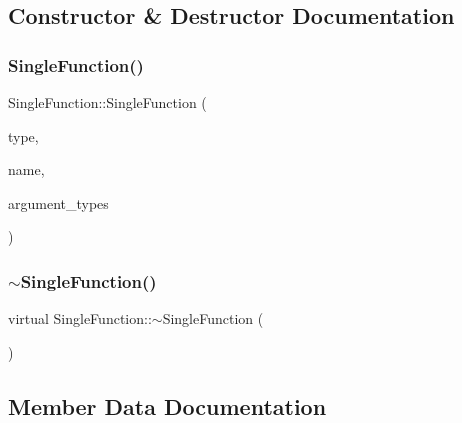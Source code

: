\subsection{Constructor \& Destructor Documentation}
\mbox{\label{classSingleFunction_a8c6cc400a8f83f317fa62de6886fde40}} 
\subsubsection{\texorpdfstring{Single\+Function()}{SingleFunction()}}
{\footnotesize\ttfamily Single\+Function\+::\+Single\+Function (\begin{DoxyParamCaption}\item[{\hyperlink{statics_8h_a025d9866e39f51183a23b3e2165f0e77}{F\+U\+N\+C\+T\+I\+O\+N\+\_\+\+T\+Y\+PE}}]{type,  }\item[{std\+::string}]{name,  }\item[{std\+::vector$<$ \hyperlink{classVarType}{Var\+Type} $>$}]{argument\+\_\+types }\end{DoxyParamCaption})}

\mbox{\label{classSingleFunction_ae414926a60c49b4039e7cd41a304ed77}} 
\subsubsection{\texorpdfstring{$\sim$\+Single\+Function()}{~SingleFunction()}}
{\footnotesize\ttfamily virtual Single\+Function\+::$\sim$\+Single\+Function (\begin{DoxyParamCaption}{ }\end{DoxyParamCaption})\hspace{0.3cm}{\ttfamily [virtual]}}



\subsection{Member Data Documentation}
\mbox{\label{classSingleFunction_a345cc7c6a42587a62495688af6644a26}} 
